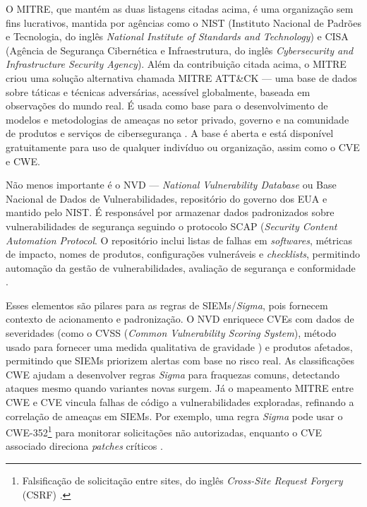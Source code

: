 O MITRE, que mantém as duas listagens citadas acima, é uma organização sem fins lucrativos, mantida por agências como o NIST (Instituto Nacional de Padrões e Tecnologia, do inglês \textit{National Institute of Standards and Technology}) 
e CISA (Agência de Segurança Cibernética e Infraestrutura, do inglês \textit{Cybersecurity and Infrastructure Security Agency}). 
Além da contribuição citada acima, o MITRE criou uma solução alternativa chamada MITRE ATT\&CK --- 
uma base de dados sobre táticas e técnicas adversárias, acessível globalmente, baseada em observações do mundo real. 
É usada como base para o desenvolvimento de modelos e metodologias de ameaças no setor privado, governo e na comunidade de produtos e serviços de cibersegurança \cite{MITRE_ATTACK}.
A base é aberta e está disponível gratuitamente para uso de qualquer indivíduo ou organização, assim como o CVE e CWE. 

Não menos importante é o NVD --- \textit{National Vulnerability Database} ou Base Nacional de Dados de Vulnerabilidades, repositório do governo dos EUA e mantido pelo NIST.
É responsável por armazenar dados padronizados sobre vulnerabilidades de segurança seguindo o protocolo SCAP (\textit{Security Content Automation Protocol}. 
O repositório inclui listas de falhas em \textit{softwares}, métricas de impacto, nomes de produtos, configurações vulneráveis e \textit{checklists}, permitindo automação da gestão de vulnerabilidades, avaliação de segurança e conformidade \cite{NIST_NVD_General}. 

Esses elementos são pilares para as regras de SIEMs/\textit{Sigma}, pois fornecem contexto de acionamento e padronização. 
O NVD enriquece CVEs com dados de severidades (como o CVSS (\textit{Common Vulnerability Scoring System}), método usado para fornecer uma medida qualitativa de gravidade \cite{NIST_NVD_Metrics})
e produtos afetados, permitindo que SIEMs priorizem alertas com base no risco real. 
As classificações CWE ajudam a desenvolver regras \textit{Sigma} para fraquezas comuns, detectando ataques mesmo quando variantes novas surgem.
Já o mapeamento MITRE entre CWE e CVE vincula falhas de código a vulnerabilidades exploradas, refinando a correlação de ameaças em SIEMs. 
Por exemplo, uma regra \textit{Sigma} pode usar o CWE-352\footnote{Falsificação de solicitação entre sites, do inglês \textit{Cross-Site Request Forgery} (CSRF) \cite{CWE_352}.} 
para monitorar solicitações não autorizadas, enquanto o CVE associado direciona \textit{patches} críticos \cite{nist_cwe_slice}.

